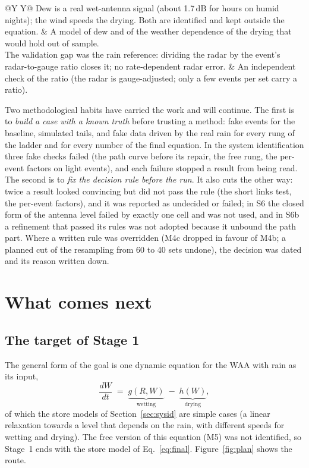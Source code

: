 \documentclass[11pt,a4paper]{article}
\newcommand{\dB}{\,\mathrm{dB}}
\begin{document}
\begin{table}[H]
\begin{tabularx}{\linewidth}{@{}Y Y@{}}
Dew is a real wet-antenna signal (about 1.7$\dB$ for hours on humid nights); the wind speeds the drying. Both are identified and kept outside the equation. &
A model of dew and of the weather dependence of the drying that would hold out of sample. \\
The validation gap was the rain reference: dividing the radar by the event's radar-to-gauge ratio closes it; no rate-dependent radar error. &
An independent check of the ratio (the radar is gauge-adjusted; only a few events per set carry a ratio). \\
\bottomrule
\end{tabularx}
\end{table}

Two methodological habits have carried the work and will continue. The first is to \emph{build a case with a known
truth} before trusting a method: fake events for the baseline, simulated tails, and fake data driven by the real rain
for every rung of the ladder and for every number of the final equation. In the system identification three fake checks failed (the path curve before its
repair, the free rung, the per-event factors on light events), and each failure stopped a result from being read. The second is to \emph{fix the decision rule
before the run}. It also cuts the other way: twice a result looked convincing but did not pass the rule (the short
links test, the per-event factors), and it was reported as undecided or failed; in S6 the closed form of the
antenna level failed by exactly one cell and was not used, and in S6b a refinement that passed its rules was not
adopted because it unbound the path part. Where a written rule was overridden (M4c dropped in favour
of M4b; a planned cut of the resampling from 60 to 40 sets undone), the decision was dated and its reason written
down.

\section{What comes next}
\label{sec:next}

\subsection{The target of Stage 1}

The general form of the goal is one dynamic equation for the WAA with rain as its input,
\begin{equation}
\frac{dW}{dt} \;=\; \underbrace{g(R, W)}_{\text{wetting}} \;-\; \underbrace{h(W)}_{\text{drying}} ,
\label{eq:target}
\end{equation}
of which the store models of Section~\ref{sec:sysid} are simple cases (a linear relaxation towards a level that
depends on the rain, with different speeds for wetting and drying). The free version of this equation (M5) was not
identified, so Stage~1 ends with the store model of Eq.~\eqref{eq:final}.
Figure~\ref{fig:plan} shows the route.
\end{document}
